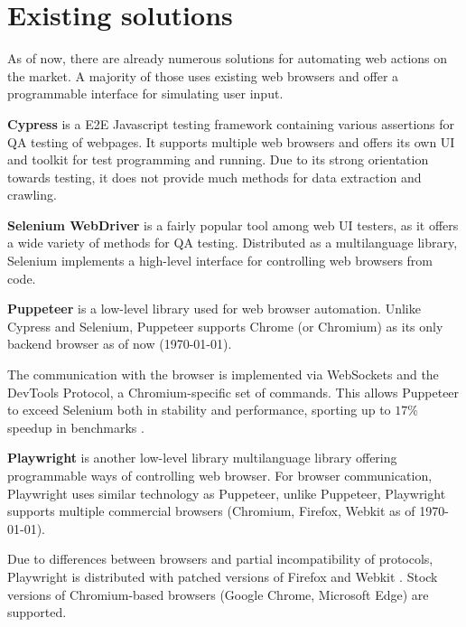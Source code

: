 
\section{Existing solutions}
As of now, there are already numerous solutions for automating web actions on the market. 
A majority of those uses existing web browsers and offer a programmable interface for simulating user input.

\textbf{Cypress} is a \ac{E2E} Javascript testing framework containing various assertions for \ac{QA} testing of webpages.
It supports multiple web browsers and offers its own UI and toolkit for test programming and running. 
Due to its strong orientation towards testing, it does not provide much methods for data extraction and crawling.

\textbf{Selenium WebDriver} is a fairly popular tool among web UI testers, as it offers a wide variety of methods for \ac{QA} testing.
Distributed as a multilanguage library, Selenium implements a high-level interface for controlling web browsers from code.

\textbf{Puppeteer} is a low-level library used for web browser automation. 
Unlike Cypress and Selenium, Puppeteer supports Chrome (or Chromium) as its only backend browser as of now (\today).

The communication with the browser is implemented via WebSockets and the DevTools Protocol, a Chromium-specific set of commands.
This allows Puppeteer to exceed Selenium both in stability and performance, sporting up to $17\%$ speedup in benchmarks .

\textbf{Playwright} is another low-level library multilanguage library offering programmable ways of controlling web browser.
For browser communication, Playwright uses similar technology as Puppeteer, unlike Puppeteer, Playwright supports multiple commercial browsers (Chromium, Firefox, Webkit as of \today).

Due to differences between browsers and partial incompatibility of protocols, Playwright is distributed with patched versions of Firefox and Webkit .
Stock versions of Chromium-based browsers (Google Chrome, Microsoft Edge) are supported. 

